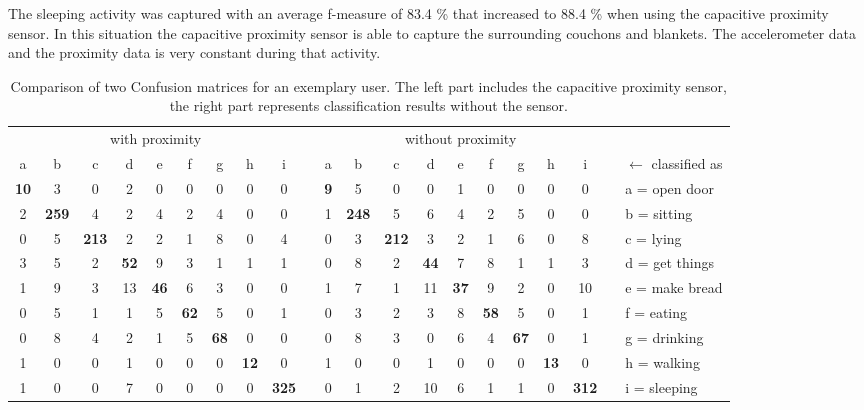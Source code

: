 \documentclass[runningheads,a4paper]{llncs}
\begin{document}
The sleeping activity was captured with an average f-measure of 83.4 \% that increased to 88.4 \% when using the capacitive proximity sensor. In this situation the capacitive proximity sensor is able to capture the surrounding couchons and blankets. The accelerometer data and the proximity data is very constant during that activity. 

\begin{table}
	\caption{Comparison of two Confusion matrices for an exemplary user. The left part includes the capacitive proximity sensor, the right part represents classification results without the sensor.}
	
	\setlength{\tabcolsep}{2.4pt}
	\centering
	
	\begin{scriptsize}
	\begin{tabular}%
	{|ccccccccc|p{0.01cm}|ccccccccc|p{0.01cm}|l}
		\multicolumn{9}{c}{with proximity} &\multicolumn{1}{c}{}& 
			\multicolumn{9}{c}{without proximity} &\multicolumn{1}{c}{}&  \\ \cmidrule{1-9} \cmidrule{11-19} 
			
		\multicolumn{1}{c}{a} & b & c & d & e & f & g & h & \multicolumn{1}{c}{i} &\multicolumn{1}{c}{}& 
			\multicolumn{1}{c}{a} & b & c & d & e & f & g & h & \multicolumn{1}{c}{i} 	&\multicolumn{1}{c}{}& $\leftarrow$ classified as\\
		\cline{1-9} \cline{11-19} \cline{21-21}
		\textbf{10} & 3 & 0 & 2 & 0 & 0 & 0 & 0 & 0 	&& \textbf{9} & 5 & 0 & 0 & 1 & 0 & 0 & 0 & 0 		&& a = open door	\\ 
		2 & \textbf{259} & 4 & 2 & 4 & 2 & 4 & 0 & 0 	&& 1 & \textbf{248} & 5 & 6 & 4 & 2 & 5 & 0 & 0 	&& b = sitting		\\ 
		0 & 5 & \textbf{213} & 2 & 2 & 1 & 8 & 0 & 4 	&& 0 & 3 & \textbf{212} & 3 & 2 & 1 & 6 & 0 & 8 	&& c = lying		\\ 
		3 & 5 & 2 & \textbf{52} & 9 & 3 & 1 & 1 & 1 	&& 0 & 8 & 2 & \textbf{44} & 7 & 8 & 1 & 1 & 3 		&& d = get things	\\ 
		1 & 9 & 3 & 13 & \textbf{46} & 6 & 3 & 0 & 0 	&& 1 & 7 & 1 & 11 & \textbf{37} & 9 & 2 & 0 & 10 	&& e = make bread	\\ 
		0 & 5 & 1 & 1 & 5 & \textbf{62} & 5 & 0 & 1 	&& 0 & 3 & 2 & 3 & 8 & \textbf{58} & 5 & 0 & 1 		&& f = eating		\\ 
		0 & 8 & 4 & 2 & 1 & 5 & \textbf{68} & 0 & 0 	&& 0 & 8 & 3 & 0 & 6 & 4 & \textbf{67} & 0 & 1 		&& g = drinking		\\
		1 & 0 & 0 & 1 & 0 & 0 & 0 & \textbf{12} & 0 	&& 1 & 0 & 0 & 1 & 0 & 0 & 0 & \textbf{13} & 0 		&& h = walking		\\
		1 & 0 & 0 & 7 & 0 & 0 & 0 & 0 & \textbf{325} 	&& 0 & 1 & 2 & 10 & 6 & 1 & 1 & 0 & \textbf{312} 	&& i = sleeping		\\ 
		\cline{1-9} \cline{11-19} 
	\end{tabular}
	\end{scriptsize}
	
	\label{tab:ConfusionMatrixForAnExemplaryUser}
\end{table}
\end{document}

